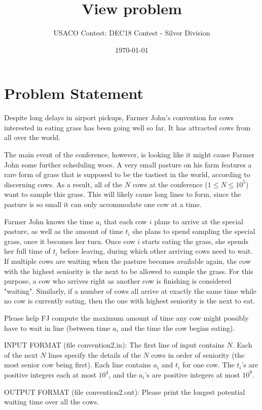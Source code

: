 \documentclass[12pt]{article}
\title{View problem}
\author{USACO Contest: DEC18 Contest - Silver Division}
\date{\today}
\begin{document}
\maketitle

\section*{Problem Statement}

Despite long delays in airport pickups, Farmer John's convention for cows
interested in  eating grass has been going well so far.  It has attracted cows
from all over the world.

The main event of the conference, however, is looking like it might cause Farmer
John some further scheduling woes.  A very small pasture on his farm features a
rare form of grass that is supposed to be the tastiest in the world, according
to discerning cows.  As a result, all of the $N$ cows at the conference
($1 \leq N \leq 10^5$) want to sample this grass.  This will likely cause long
lines to form, since the pasture is so small it can only accommodate one cow at
a time.

Farmer John knows the time $a_i$ that each cow $i$ plans to arrive at the
special pasture, as well as the amount of time $t_i$ she plans to spend sampling
the special grass, once it becomes her turn.  Once cow $i$ starts eating the
grass, she spends her full time of $t_i$ before leaving, during which other
arriving cows need to wait.  If multiple cows are waiting when the pasture
becomes available again, the cow with the highest seniority is the next to be
allowed to sample the grass.  For this purpose, a cow who arrives right as 
another cow is finishing is considered "waiting".  Similarly, if a number of 
cows all arrive at exactly the same time while no cow is currently eating,
then the one with highest seniority is the next to eat.

Please help FJ compute the maximum amount of time any cow might possibly have to
wait in line (between time $a_i$ and the time the cow begins eating).  

INPUT FORMAT (file convention2.in):
The first line of input contains $N$.  Each of the next $N$ lines specify the
details of the $N$ cows in order of seniority (the most senior cow being first).
Each line contains $a_i$ and $t_i$ for one cow.  The $t_i$'s are positive
integers each at most $10^4$, and the $a_i$'s are positive integers at most
$10^9$.  

OUTPUT FORMAT (file convention2.out):
Please print the longest potential waiting time over all the cows.  
\end{document}
